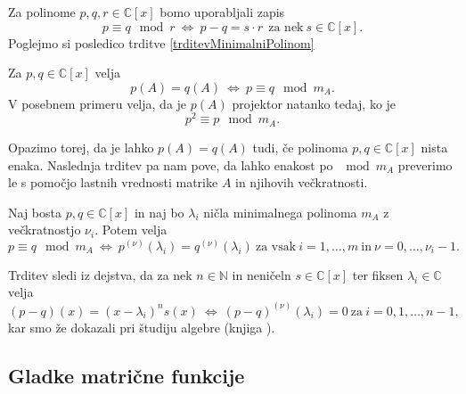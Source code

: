 \documentclass[mat1]{fmfdelo}
\newcommand{\N}{\mathbb N}
\newcommand{\C}{\mathbb C}
\begin{document}
Za polinome $p, q, r \in \C [x]$ bomo uporabljali zapis
\begin{equation*}
    p \equiv q \mod r\  \Longleftrightarrow\  p - q = s\cdot r\ \  \text{za nek}\  s\in \C [x].
\end{equation*}
Poglejmo si posledico trditve \ref{trditevMinimalniPolinom}
\begin{posledica} \label{posledicaProjekcija}
    Za $p, q \in \C [x]$ velja
    \begin{equation*}
        p(A) = q(A)\  \Longleftrightarrow\ p \equiv q \mod m_A.
    \end{equation*}
    V posebnem primeru velja, da je $p(A)$ projektor natanko tedaj, ko je
    \begin{equation*}
        p^2 \equiv p \mod m_A.
    \end{equation*}
\end{posledica}
Opazimo torej, da je lahko $p(A) = q(A)$ tudi, če polinoma $p, q \in \C [x]$ nista enaka. Naslednja trditev pa nam pove, da lahko enakost po $\mod m_A$ preverimo le s pomočjo lastnih vrednosti matrike $A$ in njihovih večkratnosti.
\begin{trditev} \label{trditevPosploseniMinimalni}
    Naj bosta $p, q \in \C [x]$ in naj bo $\lambda_i$ ničla minimalnega polinoma $m_A$ z večkratnostjo $\nu_i$. Potem velja
    \begin{equation*}
        p \equiv q \mod m_A \ \Longleftrightarrow\  p^{\left(\nu\right)}\left(\lambda_i\right) = q^{\left(\nu\right)}\left(\lambda_i\right)\ \text{za vsak}\ i = 1, \ldots, m\ \text{in}\ \nu = 0, \ldots, \nu_i-1.
    \end{equation*}
\end{trditev}
\begin{dokaz}
    Trditev sledi iz dejstva, da za nek $n\in \N$ in neničeln $s \in \C [x]$ ter fiksen $\lambda_i \in \C$ velja
    \begin{equation*}
        \left(p-q\right)(x) = \left(x-\lambda_i\right)^n s(x) \ \Longleftrightarrow\  \left(p-q\right)^{(\nu)}(\lambda_i)=0 \ \text{za}\  i=0, 1, \ldots, n-1,
    \end{equation*}
    kar smo že dokazali pri študiju algebre (knjiga \cite[poglavje 7.5]{bresar}).
\end{dokaz}

\subsection{Gladke matrične funkcije}
\end{document}

